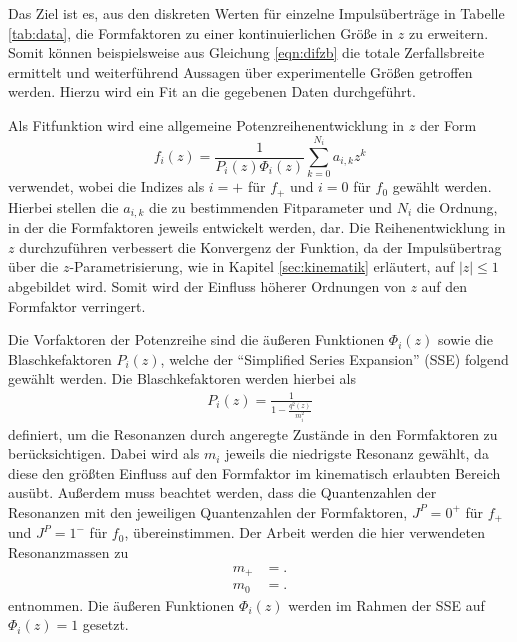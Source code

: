 Das Ziel ist es, aus den diskreten Werten für einzelne Impulsüberträge in Tabelle \ref{tab:data}, die Formfaktoren zu einer kontinuierlichen Größe in $z$ zu erweitern.
Somit können beispielsweise aus Gleichung \eqref{eqn:difzb} die totale Zerfallsbreite ermittelt und weiterführend Aussagen über experimentelle Größen getroffen werden.
Hierzu wird ein Fit an die gegebenen Daten durchgeführt. 

Als Fitfunktion wird eine allgemeine Potenzreihenentwicklung in $z$ der Form
\begin{equation}
  \label{eqn:reihenentwicklung}
  f_i(z) = \frac{1}{P_i(z) \Phi_i(z)} \sum_{k=0}^{N_i} a_{i,k} z^{k}
\end{equation}
verwendet, wobei die Indizes als $i=+$ für $f_+$ und $i=0$ für $f_0$ gewählt werden.
Hierbei stellen die $a_{i,k}$ die zu bestimmenden Fitparameter und $N_i$ die Ordnung, in der die Formfaktoren jeweils entwickelt werden, dar.
Die Reihenentwicklung in $z$ durchzuführen verbessert die Konvergenz der Funktion, da der Impulsübertrag über die $z$-Parametrisierung, wie in Kapitel \ref{sec:kinematik} erläutert, auf $\lvert z \rvert \leq 1$ abgebildet wird.
Somit wird der Einfluss höherer Ordnungen von $z$ auf den Formfaktor verringert.

Die Vorfaktoren der Potenzreihe sind die äußeren Funktionen $\Phi_i(z)$ sowie die Blaschkefaktoren $P_i(z)$, welche der \enquote{Simplified Series Expansion} (SSE) \cite{PhysRevD.79.013008} folgend gewählt werden.
Die Blaschkefaktoren werden hierbei als
\begin{align*}
  P_i(z) = \frac{1}{1 - \frac{q^2(z)}{m_i^2}}
\end{align*}
definiert, um die Resonanzen durch angeregte Zustände in den Formfaktoren zu berücksichtigen.
Dabei wird als $m_i$ jeweils die niedrigste Resonanz gewählt, da diese den größten Einfluss auf den Formfaktor im kinematisch erlaubten Bereich ausübt.
Außerdem muss beachtet werden, dass die Quantenzahlen der Resonanzen mit den jeweiligen Quantenzahlen der Formfaktoren, $J^P = 0^{+}$ für $f_+$ und $J^P = 1^-$ für $f_0$, übereinstimmen.
Der Arbeit \cite{PhysRevD.94.094008} werden die hier verwendeten Resonanzmassen zu
\begin{align*}
  m_+ &= .\\
  m_0 & = .
\end{align*}
entnommen.
Die äußeren Funktionen $\Phi_i(z)$ werden im Rahmen der SSE auf $\Phi_i(z) = \num{1}$ gesetzt.

